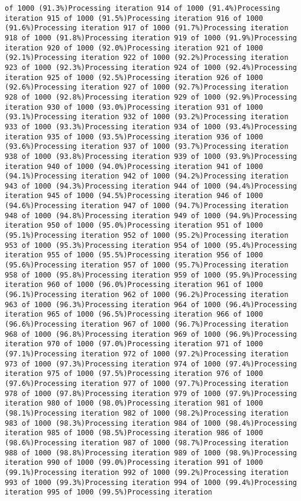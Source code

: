 \documentclass[
]{article}
\begin{document}
\begin{verbatim}
of 1000 (91.3%)Processing iteration 914 of 1000 (91.4%)Processing iteration 915 of 1000 (91.5%)Processing iteration 916 of 1000 (91.6%)Processing iteration 917 of 1000 (91.7%)Processing iteration 918 of 1000 (91.8%)Processing iteration 919 of 1000 (91.9%)Processing iteration 920 of 1000 (92.0%)Processing iteration 921 of 1000 (92.1%)Processing iteration 922 of 1000 (92.2%)Processing iteration 923 of 1000 (92.3%)Processing iteration 924 of 1000 (92.4%)Processing iteration 925 of 1000 (92.5%)Processing iteration 926 of 1000 (92.6%)Processing iteration 927 of 1000 (92.7%)Processing iteration 928 of 1000 (92.8%)Processing iteration 929 of 1000 (92.9%)Processing iteration 930 of 1000 (93.0%)Processing iteration 931 of 1000 (93.1%)Processing iteration 932 of 1000 (93.2%)Processing iteration 933 of 1000 (93.3%)Processing iteration 934 of 1000 (93.4%)Processing iteration 935 of 1000 (93.5%)Processing iteration 936 of 1000 (93.6%)Processing iteration 937 of 1000 (93.7%)Processing iteration 938 of 1000 (93.8%)Processing iteration 939 of 1000 (93.9%)Processing iteration 940 of 1000 (94.0%)Processing iteration 941 of 1000 (94.1%)Processing iteration 942 of 1000 (94.2%)Processing iteration 943 of 1000 (94.3%)Processing iteration 944 of 1000 (94.4%)Processing iteration 945 of 1000 (94.5%)Processing iteration 946 of 1000 (94.6%)Processing iteration 947 of 1000 (94.7%)Processing iteration 948 of 1000 (94.8%)Processing iteration 949 of 1000 (94.9%)Processing iteration 950 of 1000 (95.0%)Processing iteration 951 of 1000 (95.1%)Processing iteration 952 of 1000 (95.2%)Processing iteration 953 of 1000 (95.3%)Processing iteration 954 of 1000 (95.4%)Processing iteration 955 of 1000 (95.5%)Processing iteration 956 of 1000 (95.6%)Processing iteration 957 of 1000 (95.7%)Processing iteration 958 of 1000 (95.8%)Processing iteration 959 of 1000 (95.9%)Processing iteration 960 of 1000 (96.0%)Processing iteration 961 of 1000 (96.1%)Processing iteration 962 of 1000 (96.2%)Processing iteration 963 of 1000 (96.3%)Processing iteration 964 of 1000 (96.4%)Processing iteration 965 of 1000 (96.5%)Processing iteration 966 of 1000 (96.6%)Processing iteration 967 of 1000 (96.7%)Processing iteration 968 of 1000 (96.8%)Processing iteration 969 of 1000 (96.9%)Processing iteration 970 of 1000 (97.0%)Processing iteration 971 of 1000 (97.1%)Processing iteration 972 of 1000 (97.2%)Processing iteration 973 of 1000 (97.3%)Processing iteration 974 of 1000 (97.4%)Processing iteration 975 of 1000 (97.5%)Processing iteration 976 of 1000 (97.6%)Processing iteration 977 of 1000 (97.7%)Processing iteration 978 of 1000 (97.8%)Processing iteration 979 of 1000 (97.9%)Processing iteration 980 of 1000 (98.0%)Processing iteration 981 of 1000 (98.1%)Processing iteration 982 of 1000 (98.2%)Processing iteration 983 of 1000 (98.3%)Processing iteration 984 of 1000 (98.4%)Processing iteration 985 of 1000 (98.5%)Processing iteration 986 of 1000 (98.6%)Processing iteration 987 of 1000 (98.7%)Processing iteration 988 of 1000 (98.8%)Processing iteration 989 of 1000 (98.9%)Processing iteration 990 of 1000 (99.0%)Processing iteration 991 of 1000 (99.1%)Processing iteration 992 of 1000 (99.2%)Processing iteration 993 of 1000 (99.3%)Processing iteration 994 of 1000 (99.4%)Processing iteration 995 of 1000 (99.5%)Processing iteration 
\end{verbatim}
\end{document}

